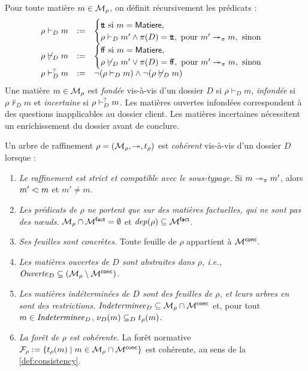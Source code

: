 \documentclass[review]{jflart}
\begin{document}
\begin{defi}\label{def:fondee}
Pour toute matière $m\in\mathcal{M}_\rho$, on définit récursivement les prédicats :
\[ 
\begin{array}{lll}
	\rho\vdash_D m &:=& 
		\begin{cases} 
			{\mathsf{t\!t}}\hbox{ si } m=\mathsf{Matiere},\\ 
			\rho \vdash_D m'  \wedge \pi(D)={\mathsf{t\!t}},\hbox{ pour }m'\mathrel{\twoheadrightarrow_{\pi}} m,\hbox{ sinon}
		\end{cases}  \\
	\rho\not\vdash_D m &:=& \begin{cases} 
			{\mathsf{f\!f}}\hbox{ si } m=\mathsf{Matiere},\\ 
			\rho \not\vdash_D m'  \vee \pi(D)={\mathsf{f\!f}},\hbox{ pour }m'\mathrel{\twoheadrightarrow_{\pi}} m,\hbox{ sinon}
		\end{cases} \\
	\rho\vdash_D^{\mathord{?}} m &:=& \neg (\rho\vdash_D m) \wedge \neg (\rho\not\vdash_D m)
\end{array}
\]
Une matière $m\in\mathcal{M}_\rho$ est \emph{fondée} vis-à-vis d'un dossier $D$ si $\rho\vdash_D m$, \emph{infondée} si $\rho\not\vdash_D m$ et \emph{incertaine} si $\rho\vdash_D^{\mathord{?}} m$. Les matières ouvertes infondées correspondent à des questions inapplicables au dossier client. Les matières incertaines nécessitent un enrichissement du dossier avant de conclure.
\end{defi}
\begin{defi}\label{def:coh-raff}
Un arbre de raffinement \(\rho=(\mathcal{M}_\rho,\mathrel{\twoheadrightarrow},t_\rho)\) est \emph{cohérent} vis-à-vis d'un dossier $D$ lorsque :
\begin{enumerate}
\item \emph{Le raffinement est strict et compatible avec le sous-typage.} Si
  \(m\mathrel{\twoheadrightarrow_{\pi}}m'\), alors \(m'\mathrel{<\!:} m\) et \(m'\neq m\).
\item \emph{Les prédicats de $\rho$ ne portent que sur des matières factuelles, qui ne sont pas des nœuds.} $\mathcal{M}_\rho\cap\mathcal{M}^{\mathsf{fact}}=\emptyset$ et $\mathit{dep}(\rho)\subseteq \mathcal{M}^{\mathsf{fact}}$.
\item \emph{Ses feuilles sont concrètes.} Toute feuille de \(\rho\) appartient à \(\mathcal{M}^{\mathsf{conc}}\).
\item \emph{Les matières ouvertes de $D$ sont abstraites dans $\rho$, i.e.,} $\mathit{Ouverte}_D \subseteq (\mathcal{M}_\rho\setminus\mathcal{M}^{\mathsf{conc}})$.
\item \emph{Les matières indéterminées de $D$ sont des feuilles de $\rho$, et
  leurs arbres en sont des restrictions.} $\mathit{Indeterminee}_D\subseteq \mathcal{M}_\rho\cap\mathcal{M}^{\mathsf{conc}}$
  et, pour tout \(m\in\mathit{Indeterminee}_D\), \(\nu_D(m) \subseteq_D t_\rho(m)\).
\item \emph{La forêt de $\rho$ est cohérente.} La forêt normative
  \(\mathcal{F}_\rho:=\{t_\rho(m)\mid m\in\mathcal{M}_\rho\cap\mathcal{M}^{\mathsf{conc}}\}\) est cohérente,
  au sens de la \autoref{def:consistency}.
\end{enumerate}
\end{defi}
\end{document}
